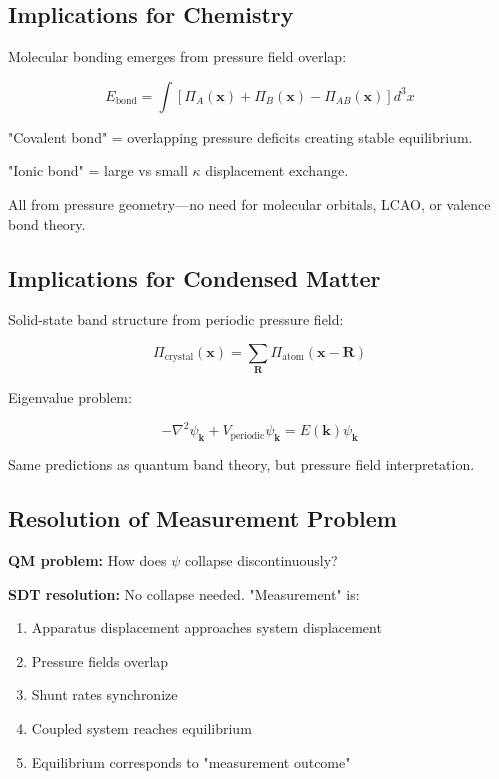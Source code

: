\subsection{Implications for Chemistry}

Molecular bonding emerges from pressure field overlap:

\begin{equation}
E_{\text{bond}} = \int [\Pi_A(\mathbf{x}) + \Pi_B(\mathbf{x}) - \Pi_{AB}(\mathbf{x})] d^3x
\end{equation}

"Covalent bond" = overlapping pressure deficits creating stable equilibrium.

"Ionic bond" = large vs small $\kappa$ displacement exchange.

All from pressure geometry—no need for molecular orbitals, LCAO, or valence bond theory.

\subsection{Implications for Condensed Matter}

Solid-state band structure from periodic pressure field:

\begin{equation}
\Pi_{\text{crystal}}(\mathbf{x}) = \sum_{\mathbf{R}} \Pi_{\text{atom}}(\mathbf{x} - \mathbf{R})
\end{equation}

Eigenvalue problem:

\begin{equation}
-\nabla^2 \psi_{\mathbf{k}} + V_{\text{periodic}} \psi_{\mathbf{k}} = E(\mathbf{k}) \psi_{\mathbf{k}}
\end{equation}

Same predictions as quantum band theory, but pressure field interpretation.

\subsection{Resolution of Measurement Problem}

\textbf{QM problem:} How does $\psi$ collapse discontinuously?

\textbf{SDT resolution:} No collapse needed. "Measurement" is:

\begin{enumerate}
\item Apparatus displacement approaches system displacement
\item Pressure fields overlap
\item Shunt rates synchronize
\item Coupled system reaches equilibrium
\item Equilibrium corresponds to "measurement outcome"
\end{enumerate}

